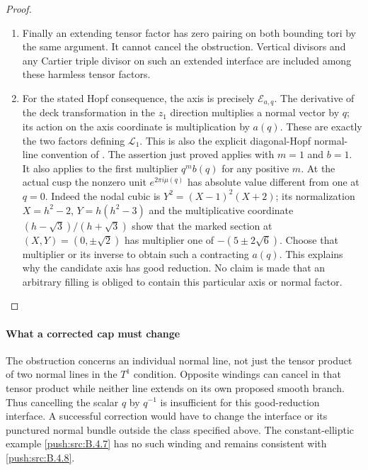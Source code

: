 \begin{proof}
\begin{enumerate}[label=\arabic*.,leftmargin=*]
\item Finally an extending tensor factor has zero pairing on
both bounding tori by the same argument.  It cannot
cancel the obstruction.  Vertical divisors and any
Cartier triple divisor on such an extended interface
are included among these harmless tensor factors.

\item For the stated Hopf consequence, the axis is precisely
$\mathcal E_{a,q}$.
The derivative of the deck transformation in the $z_1$
direction multiplies a normal vector by $q$; its action
on the axis coordinate is multiplication by $a(q)$.
These are exactly the two factors defining
$\mathcal L_1$.  This is also the explicit diagonal-Hopf
normal-line convention of
\citet[Section 2.2]{AbashevaDeev2024AB}.
The assertion just proved applies with $m=1$ and $b=1$.
It also applies to the first multiplier $q^m b(q)$ for
any positive $m$.  At the actual cusp the nonzero unit
$e^{2\pi i\mu(q)}$ has absolute value different from one
at $q=0$.  Indeed the nodal cubic is
$Y^2=(X-1)^2(X+2)$; its normalization
$X=h^2-2$, $Y=h(h^2-3)$ and the multiplicative coordinate
$(h-\sqrt3)/(h+\sqrt3)$ show that the marked section at
$(X,Y)=(0,\pm\sqrt2)$ has multiplier one of
$-(5\pm2\sqrt6)$.
Choose that multiplier or its inverse to obtain
such a contracting $a(q)$.
This explains why the candidate axis has good reduction.
No claim is made that an arbitrary filling is obliged
to contain this particular axis or normal factor.
\end{enumerate}
\end{proof}


\paragraph{What a corrected cap must change}
The obstruction concerns an individual normal line,
not just the tensor product of two normal lines in
the $T^1$ condition.  Opposite windings can cancel in
that tensor product while neither line extends on its
own proposed smooth branch.  Thus cancelling the
scalar $q$ by $q^{-1}$ is insufficient for this
good-reduction interface.  A successful correction
would have to change the interface or its punctured
normal bundle outside the class specified above.
The constant-elliptic example \ref{push:src:B.4.7} has no such
winding and remains consistent with \ref{push:src:B.4.8}.




